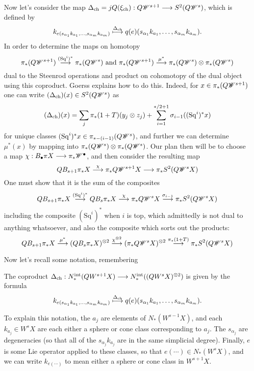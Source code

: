 \documentclass[10pt]{article}
\newcommand{\Sq}{\mathrm{Sq}}
\begin{document}
\begin{Koszul Actions}
Now let's consider the map $\Delta_\textup{ch}=j\circ Q(\xi_\textup{ch}):Q\scrW^{s+1}\to S^2(Q\scrW^{s})$, which is defined by 
\[k_{e(s_{\alpha_1}k_{a_1},\ldots,s_{\alpha_m}k_{a_m})}\overset{\Delta_\textup{ch}}{\mapsto}q(e)(s_{\alpha_1}k_{a_1},\ldots,s_{\alpha_m}k_{a_m}).\]
In order to determine the maps on homotopy 
\[\pi_*(Q\scrW^{s+1})\overset{(\Sq^i)^*}{\to} \pi_*(Q\scrW^{s})\textup{ and }\pi_*(Q\scrW^{s+1})\overset{\mu^*}{\to} \pi_*(Q\scrW^{s})\otimes \pi_*(Q\scrW^{s})\]
dual to the Steenrod operations and product on cohomotopy of the dual object using this coproduct. Goerss explains how to do this. Indeed, for $x\in \pi_*(Q\scrW^{s+1})$ one can write $(\Delta_\textup{ch})(x)\in S^2(Q\scrW^s)$ as
\[(\Delta_\textup{ch})(x)=\sum_j\pi_*(1+T)(y_j\otimes z_j)+\sum_{i=1}^{*/2+1}\sigma_{i-1}((\Sq^i)^*x)\]
for unique classes $(\Sq^i)^*x\in\pi_{*-(i-1)}(Q\scrW^s)$, and further we can determine $\mu^*(x)$ by mapping into $\pi_*(Q\scrW^s)\otimes\pi_*(Q\scrW^s)$. Our plan then will be to choose a map $\chi:B_{\bullet}\pi X\to \pi_*\scrW^{\bullet}$, and then consider the resulting map
\[QB_{s+1}\pi_* X\overset{\chi}{\to}\pi_*Q\scrW^{s+1}X\to \pi_*S^2(Q\scrW^{s}X)\]
One must show that it is the sum of the composites
\[QB_{s+1}\pi_* X\overset{(\Sq^i)^*}{\to} QB_{s}\pi_* X\overset{\chi}{\to} \pi_*Q\scrW^{s}X\overset{\sigma_{i-1}}{\to} \pi_*S^2(Q\scrW^{s}X)\]
including the composite $(\Sq^i)^*$ when $i$ is top, which admittedly is not dual to anything whatsoever, and also the composite which sorts out the products:
\[QB_{s+1}\pi_* X\overset{\mu^*}{\to}(QB_{s}\pi_* X)^{\otimes2}\overset{\chi^{\otimes2}}{\to}(\pi_*Q\scrW^{s}X)^{\otimes2}\overset{\pi_*(1+T)}{\to}\pi_*S^2(Q\scrW^{s}X)\]

\begin{shaded}
Now let's recall some notation, remembering
\begin{prop}
The coproduct $\Delta_\textup{ch}:N_*^\textup{int}(QW^{s+1}X)\to N_*^\textup{int}((QW^{s}X)^{\otimes2})$ is given by the formula
\[k_{e(s_{\alpha_1}k_{a_1},\ldots,s_{\alpha_m}k_{a_m})}\overset{\Delta_\textup{ch}}{\mapsto}q(e)(s_{\alpha_1}k_{a_1},\ldots,s_{\alpha_m}k_{a_m}).\]
\end{prop}
To explain this notation, the $a_j$ are elements of $N_*(W^{s-1}X)$, and each $k_{a_j}\in W^sX$ are each either a sphere or cone class corresponding to $a_j$. The $s_{\alpha_j}$ are degeneracies (so that all of the $s_{\alpha_j}k_{a_j}$ are in the same simplicial degree). Finally, $e$ is some Lie operator applied to these classes, so that $e(\cdots )\in N_*(W^sX)$, and we can write $k_{e(\cdots )}$ to mean either a sphere or cone class in $W^{s+1}X$.
\end{shaded}


\end{Koszul Actions}
\end{document}
